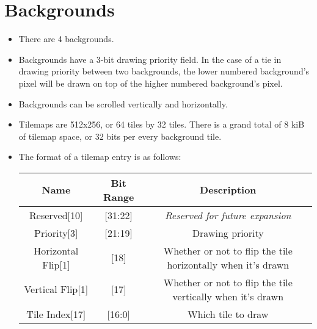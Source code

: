\documentclass{article}
\begin{document}
\section{Backgrounds}
	\begin{itemize}
	\item There are 4 backgrounds.

	\item Backgrounds have a 3-bit drawing priority field.  In the case of
	a tie in drawing priority between two backgrounds, the lower numbered
	background's pixel will be drawn on top of the higher numbered
	background's pixel.

	\item Backgrounds can be scrolled vertically and horizontally.

	\item Tilemaps are 512x256, or 64 tiles by 32 tiles.  There is a grand
	total of 8 kiB of tilemap space, or 32 bits per every background tile.

	\item The format of a tilemap entry is as follows:
		\begin{table}[H]
			\begin{center}
				\begin{tabular}{|c|c|c|}
					\hline
					\textbf{Name} & \textbf{Bit Range}
						& \textbf{Description}\\
					\hline
					Reserved[10] & [31:22]
						& \textit{Reserved for future expansion}\\
					Priority[3] & [21:19]
						& Drawing priority\\
					Horizontal Flip[1] & [18]
						& Whether or not to flip the tile horizontally
						when it's drawn\\
					Vertical Flip[1] & [17]
						& Whether or not to flip the tile vertically
						when it's drawn\\
					Tile Index[17] & [16:0]
						& Which tile to draw\\
					\hline
				\end{tabular}
			\end{center}
		\end{table}
	\end{itemize}
	\newpage



\end{document}
